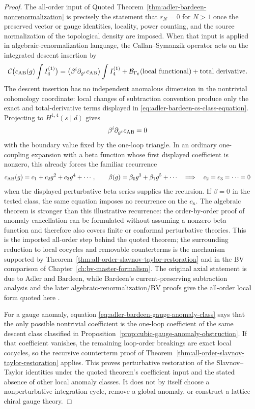 \begin{proof}
The all-order input of Quoted
Theorem~\ref{thm:adler-bardeen-nonrenormalization} is precisely the statement
that \(r_N=0\) for \(N>1\) once the preserved vector or gauge identities,
locality, power counting, and the source normalization of the topological
density are imposed.  When that input is applied in
algebraic-renormalization language, the Callan--Symanzik operator acts on the
integrated descent insertion by
\begin{equation}
  \mathcal C\bigl(c_{\rm AB}(g)\int I_4^{(1)}\bigr)
  =
  \bigl(\beta^i\partial_{g^i}c_{\rm AB}\bigr)\int I_4^{(1)}
  +
  \mathcal B_{\Gamma_0}(\text{local functional})
  +
  \text{total derivative}.
  \label{eq:adler-bardeen-cs-class-equation}
\end{equation}
The descent insertion has no independent anomalous dimension in the
nontrivial cohomology coordinate: local changes of subtraction convention
produce only the exact and total-derivative terms displayed in
\eqref{eq:adler-bardeen-cs-class-equation}.  Projecting to
\(H^{1,4}(s\mid d)\) gives
\[
  \beta^i\partial_{g^i}c_{\rm AB}=0
\]
with the boundary value fixed by the one-loop triangle.  In an ordinary
one-coupling expansion with a beta function whose first displayed coefficient
is nonzero, this already forces the familiar recurrence
\[
  c_{\rm AB}(g)=c_1+c_2g^2+c_3g^4+\cdots,\qquad
  \beta(g)=\beta_0g^3+\beta_1g^5+\cdots
  \quad\Longrightarrow\quad
  c_2=c_3=\cdots=0
\]
when the displayed perturbative beta series supplies the recursion.  If
\(\beta=0\) in the tested class, the same equation imposes no recurrence on
the \(c_n\).  The algebraic theorem is stronger than this illustrative
recurrence: the
order-by-order proof of anomaly cancellation can be formulated without
assuming a nonzero beta function and therefore also covers finite or conformal
perturbative theories.  This is the imported all-order step behind the
quoted theorem; the surrounding reduction to local cocycles and removable
counterterms is the mechanism supported by
Theorem~\ref{thm:all-order-slavnov-taylor-restoration} and in the BV
comparison of Chapter~\ref{ch:bv-master-formalism}.  The original axial
statement is due to Adler and Bardeen, while Bardeen's current-preserving
subtraction analysis and the later algebraic-renormalization/BV proofs give
the all-order local form quoted here
\cite{AdlerBardeen1969,Bardeen1969AnomalousWard,PiguetSorella1995,
BarnichBrandtHenneaux2000,Anselmi2014AdlerBardeen}.

For a gauge anomaly, equation
\eqref{eq:adler-bardeen-gauge-anomaly-class} says that the only possible
nontrivial coefficient is the one-loop coefficient of the same descent class
classified in Proposition~\ref{prop:cubic-gauge-anomaly-obstruction}.  If
that coefficient vanishes, the remaining loop-order breakings are exact local
cocycles, so the recursive counterterm proof of
Theorem~\ref{thm:all-order-slavnov-taylor-restoration} applies.  This proves
perturbative restoration of the Slavnov--Taylor identities under the quoted
theorem's coefficient input and the stated absence of other local anomaly
classes.  It does not by itself choose a nonperturbative integration cycle,
remove a global anomaly, or construct a lattice chiral gauge theory.
\end{proof}

